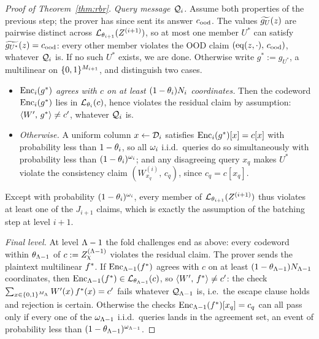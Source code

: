 \begin{proof}[Proof of Theorem~\ref{thm:rbr}]
\medskip\noindent\emph{Query message $\mathcal{Q}_i$.}
Assume both properties of the previous step; the prover has since sent its answer $c_{\mathrm{ood}}$. The values $\widetilde{g_U}(z)$ are pairwise distinct across $\mathcal{L}_{\theta_{i+1}}(Z^{(i+1)})$, so at most one member $U^\ast$ can satisfy $\widetilde{g_{U^\ast}}(z) = c_{\mathrm{ood}}$: every other member violates the OOD claim $(\operatorname{eq}(z, \cdot),\, c_{\mathrm{ood}})$, whatever $\mathcal{Q}_i$ is. If no such $U^\ast$ exists, we are done. Otherwise write $g^\ast := g_{U^\ast}$, a multilinear on $\{0,1\}^{M_{i+1}}$, and distinguish two cases.
\begin{itemize}[itemsep=1pt]
\item \emph{$\mathrm{Enc}_i(g^\ast)$ agrees with $c$ on at least $(1 - \theta_i) N_i$ coordinates.} Then the codeword $\mathrm{Enc}_i(g^\ast)$ lies in $\mathcal{L}_{\theta_i}(c)$, hence violates the residual claim by assumption: $\langle W',\, g^\ast \rangle \neq c'$, whatever $\mathcal{Q}_i$ is.
\item \emph{Otherwise.} A uniform column $x \leftarrow \mathcal{D}_i$ satisfies $\mathrm{Enc}_i(g^\ast)[x] = c[x]$ with probability less than $1 - \theta_i$, so all $\omega_i$ i.i.d.\ queries do so simultaneously with probability less than $(1 - \theta_i)^{\omega_i}$; and any disagreeing query $x_q$ makes $U^\ast$ violate the consistency claim $(W^{(i)}_{x_q},\, c_q)$, since $c_q = c[x_q]$.
\end{itemize}
Except with probability $(1 - \theta_i)^{\omega_i}$, every member of $\mathcal{L}_{\theta_{i+1}}(Z^{(i+1)})$ thus violates at least one of the $J_{i+1}$ claims, which is exactly the assumption of the batching step at level $i + 1$.

\medskip\noindent\emph{Final level.}
At level $\Lambda - 1$ the fold challenges end as above: every codeword within $\theta_{\Lambda-1}$ of $c := Z^{(\Lambda-1)}_\chi$ violates the residual claim. The prover sends the plaintext multilinear $f^{\ast}$. If $\mathrm{Enc}_{\Lambda-1}(f^{\ast})$ agrees with $c$ on at least $(1 - \theta_{\Lambda-1}) N_{\Lambda-1}$ coordinates, then $\mathrm{Enc}_{\Lambda-1}(f^{\ast}) \in \mathcal{L}_{\theta_{\Lambda-1}}(c)$, so $\langle W',\, f^{\ast} \rangle \neq c'$: the check $\sum_{x \in \{0,1\}^{M_\Lambda}} W'(x)\, f^{\ast}(x) = c'$ fails whatever $\mathcal{Q}_{\Lambda-1}$ is, i.e.\ the escape clause holds and rejection is certain. Otherwise the checks $\mathrm{Enc}_{\Lambda-1}(f^{\ast})[x_q] = c_q$ can all pass only if every one of the $\omega_{\Lambda-1}$ i.i.d.\ queries lands in the agreement set, an event of probability less than $(1 - \theta_{\Lambda-1})^{\omega_{\Lambda-1}}$.

\end{proof}


